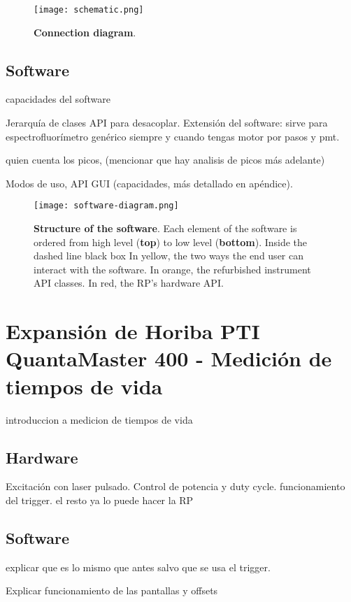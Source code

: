 \begin{figure}[h]
     \centering
     \texttt{[image: schematic.png]}
     \caption{\textbf{Connection diagram}.
     }
     \label{fig:schematic}
\end{figure}

\subsection{Software}

capacidades del software 

Jerarquía de clases API para desacoplar. Extensión del software: sirve para espectrofluorímetro genérico siempre y cuando tengas motor por pasos y pmt.

quien cuenta los picos, (mencionar que hay analisis de picos más adelante)

Modos de uso, API GUI (capacidades, más detallado en apéndice).

\begin{figure}[h]
     \centering
     \caption{\textbf{Structure of the software}. Each element of the software is ordered from high level (\textbf{top}) to low level (\textbf{bottom}). Inside the dashed line black box In yellow, the two ways the end user can interact with the software. In orange, the refurbished instrument API classes. In red, the RP's hardware API.}
     \texttt{[image: software-diagram.png]}
     \label{fig:code}
\end{figure}


\section{Expansión de Horiba PTI QuantaMaster 400 - Medición de tiempos de vida}

introduccion a medicion de tiempos de vida

\subsection{Hardware}

Excitación con laser pulsado. Control de potencia y duty cycle. funcionamiento del trigger. el resto ya lo puede hacer la RP

\subsection{Software}

explicar que es lo mismo que antes salvo que se usa el trigger.

Explicar funcionamiento de las pantallas y offsets
